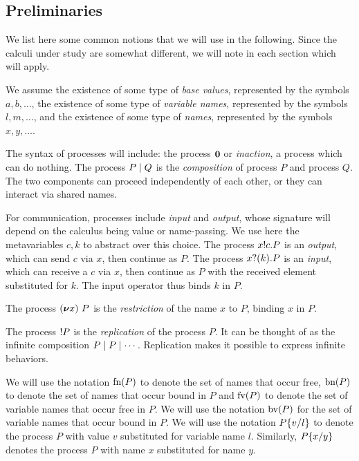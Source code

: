 \subsection{Preliminaries}
\label{sec:prelim}

We list here some common notions that we will use in the following. Since the calculi under study are somewhat different, we will note in each section which will apply.

We assume the existence of some type of \emph{base values}, represented by the symbols
\( a, b, \dots \), the existence of some type
of \emph{variable names}, represented by the symbols
\( l, m, \dots \), and the existence of some type of \emph{names},
represented by the symbols \( x, y, \dots \).  %

The syntax of processes will include:
the process \( \bm{0} \) or \emph{inaction}, a process which can do nothing. The process \( P \mid Q \) is the \emph{composition} of process \( P \) and process \( Q \).
The two components can proceed independently of each other, or they can interact via shared names.

For communication, processes include \emph{input} and \emph{output}, whose
signature will depend on the calculus being value or name-passing.
We use here the metavariables $c,k$ to abstract over this choice.
The process \( x ! c . P \) is an \emph{output}, which can send
\( c \) via \( x \), then continue as \( P \).  %
The process \( x ? (k) . P \) is an \emph{input}, which can receive a $c$
via \( x \), then continue as \( P \) with the received element
substituted for \( k \).  The input operator thus
binds \( k \) in \( P \).

The process \( (\bm{\nu} x)~P \) is the \emph{restriction} of the name
\( x \) to \( P \), binding \( x \) in \( P \).


The process \( {!}P \) is the \emph{replication} of the process \( P \).
It can be thought of as the infinite composition \( P \mid P \mid \cdots \).
Replication makes it possible to express infinite behaviors.

We will use the notation \( \textrm{fn}(P) \) to denote the set of
names that occur free,
\( \textrm{bn}(P) \) to denote the set of names that occur bound
in \( P \) and  \( \textrm{fv}(P) \)
to denote the set of variable names that occur free
in \( P \).  We will use the notation \( \textrm{bv}(P) \)
for the set of variable names that occur bound
in \( P \).  We will use the notation \( P\{v/l\} \) to denote
the process \( P \) with value \( v \) substituted for variable name
\( l \). Similarly, \( P\{x/y\} \) denotes the process
\( P \) with name \( x \) substituted for name \( y \).


